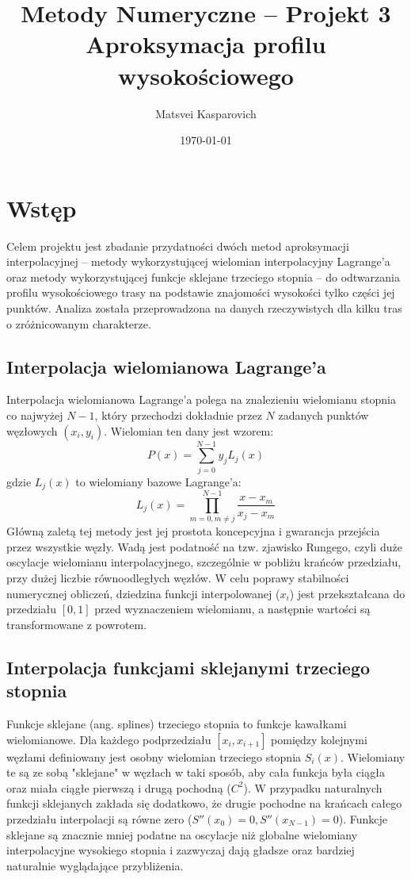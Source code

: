 \documentclass[11pt,a4paper]{article}
\title{Metody Numeryczne – Projekt 3 \\ Aproksymacja profilu wysokościowego}
\author{Matsvei Kasparovich} %
\date{\today}
\begin{document}
\maketitle
\thispagestyle{empty}
\newpage
\tableofcontents
\thispagestyle{empty}
\newpage
\setcounter{page}{1}

\section{Wstęp}
\label{sec:wstep}
Celem projektu jest zbadanie przydatności dwóch metod aproksymacji interpolacyjnej – metody wykorzystującej wielomian interpolacyjny Lagrange’a oraz metody wykorzystującej funkcje sklejane trzeciego stopnia – do odtwarzania profilu wysokościowego trasy na podstawie znajomości wysokości tylko części jej punktów. Analiza została przeprowadzona na danych rzeczywistych dla kilku tras o zróżnicowanym charakterze.

\subsection{Interpolacja wielomianowa Lagrange'a}
Interpolacja wielomianowa Lagrange'a polega na znalezieniu wielomianu stopnia co najwyżej $N-1$, który przechodzi dokładnie przez $N$ zadanych punktów węzłowych $(x_i, y_i)$. Wielomian ten dany jest wzorem:
\[ P(x) = \sum_{j=0}^{N-1} y_j L_j(x) \]
gdzie $L_j(x)$ to wielomiany bazowe Lagrange'a:
\[ L_j(x) = \prod_{m=0, m \neq j}^{N-1} \frac{x - x_m}{x_j - x_m} \]
Główną zaletą tej metody jest jej prostota koncepcyjna i gwarancja przejścia przez wszystkie węzły. Wadą jest podatność na tzw. zjawisko Rungego, czyli duże oscylacje wielomianu interpolacyjnego, szczególnie w pobliżu krańców przedziału, przy dużej liczbie równoodległych węzłów. W celu poprawy stabilności numerycznej obliczeń, dziedzina funkcji interpolowanej ($x_i$) jest przekształcana do przedziału $[0,1]$ przed wyznaczeniem wielomianu, a następnie wartości są transformowane z powrotem.

\subsection{Interpolacja funkcjami sklejanymi trzeciego stopnia}
Funkcje sklejane (ang. splines) trzeciego stopnia to funkcje kawałkami wielomianowe. Dla każdego podprzedziału $[x_i, x_{i+1}]$ pomiędzy kolejnymi węzłami definiowany jest osobny wielomian trzeciego stopnia $S_i(x)$. Wielomiany te są ze sobą "sklejane" w węzłach w taki sposób, aby cała funkcja była ciągła oraz miała ciągłe pierwszą i drugą pochodną ($C^2$).
W przypadku naturalnych funkcji sklejanych zakłada się dodatkowo, że drugie pochodne na krańcach całego przedziału interpolacji są równe zero ($S''(x_0) = 0, S''(x_{N-1}) = 0$).
Funkcje sklejane są znacznie mniej podatne na oscylacje niż globalne wielomiany interpolacyjne wysokiego stopnia i zazwyczaj dają gładsze oraz bardziej naturalnie wyglądające przybliżenia.
\end{document}
